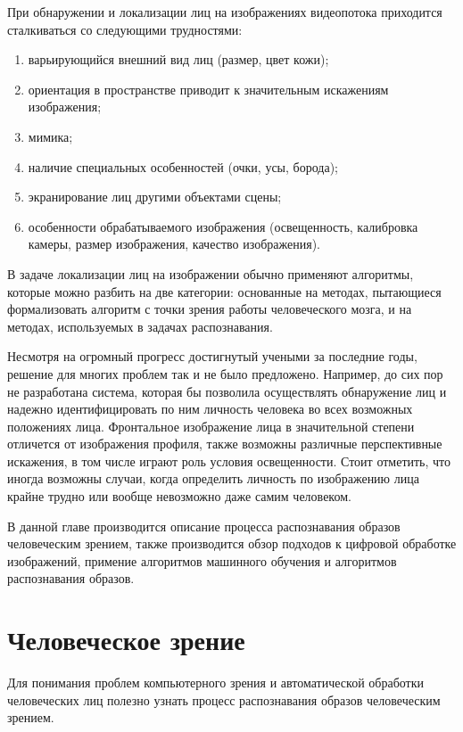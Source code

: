 При обнаружении и локализации лиц на изображениях видеопотока приходится
сталкиваться со следующими трудностями:

\begin{enumerate}
  \item варьирующийся внешний вид лиц (размер, цвет кожи);
  \item ориентация в пространстве приводит к значительным искажениям
изображения;
  \item мимика;
  \item наличие специальных особенностей (очки, усы, борода);
  \item экранирование лиц другими объектами сцены;
  \item особенности обрабатываемого изображения (освещенность, калибровка
камеры, размер изображения, качество изображения).
\end{enumerate}

В задаче локализации лиц на изображении обычно применяют алгоритмы, которые
можно разбить на две категории: основанные на методах, пытающиеся формализовать
алгоритм с точки зрения работы человеческого мозга, и на методах, используемых
в задачах распознавания.

Несмотря на огромный прогресс достигнутый учеными за последние годы, решение для многих проблем так и не было предложено. Например, до сих пор не разработана система, которая бы позволила осуществлять обнаружение лиц и надежно идентифицировать по ним личность человека во всех возможных положениях лица. Фронтальное изображение лица в значительной степени отличется от изображения профиля, также возможны различные перспективные искажения, в том числе играют роль условия освещенности. Стоит отметить, что иногда возможны случаи, когда определить личность по изображению лица крайне трудно или вообще невозможно даже самим человеком.



В данной главе производится описание процесса распознавания образов человеческим зрением, также производится обзор подходов к цифровой обработке изображений, примение алгоритмов машинного обучения и алгоритмов распознавания образов.

\section{Человеческое зрение}
Для понимания проблем компьютерного зрения и автоматической обработки человеческих лиц полезно узнать процесс распознавания образов человеческим зрением.

